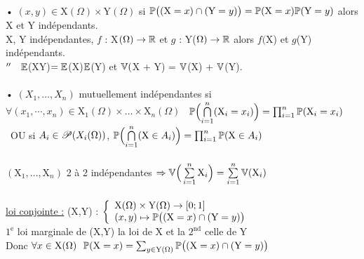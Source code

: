 \documentclass[12 pt]{exampleclass}
\begin{document}
\begin{flushleft}
\begin{doublespace}
	\text{ }\\
	• $(x,y)\in\text{X}(\Omega)\times \text{Y}(\Omega)$ si $\mathbb{P}\big( (\text{X} = x) \cap (\text{Y} = y) \big) = \mathbb{P}(\text{X} =x ) \mathbb{P} (\text{Y} = y)$ alors X et Y indépendants.\\
	X, Y indépendantes, $f$ : X$(\Omega) \rightarrow \mathbb{R}$ et $g$ : Y($\Omega) \rightarrow \mathbb{R}$ alors $f($X) et $g$(Y) indépendants.\\
	\qquad $''  \quad \mathbb{E}$(XY)$ = \mathbb{E}$(X)$\mathbb{E}$(Y) et $\mathbb{V}($X + Y) = $\mathbb{V}$(X) + $\mathbb{V}$(Y).\\
	\text{ }\\
	• $(X_1,\dots, X_n)$ mutuellement indépendantes si $\forall (x_1,\cdots,x_n)\in \text{X}_1(\Omega)\times \dots \times \text{X}_n(\Omega)$ \ $\mathbb{P} \Big( \underset{i = 1}{\overset{n}{\bigcap}} (\text{X}_i = x_i) \Big) = \prod_{ i = 1}^n \mathbb{P} (\text{X}_i = x_i)$ \ OU si $A_i\in \mathscr{P}(X_i(\Omega))$, $\mathbb{P} \Big( \underset{i = 1}{\overset{n}{\bigcap}} (\text{X}\in A_i) \Big) = \prod_{ i = 1}^n \mathbb{P} (\text{X}\in A_i)$\\
	\text{ }\\
	$(\text{X}_1,\dots,\text{X}_n)$ 2 à 2 indépendantes $\Rightarrow\mathbb{V} \Big( \sum\limits_{i = 1}^n \text{X}_i  \Big)= \sum\limits_{i = 1}^n \mathbb{V}(\text{X}_i)$\\
	
	\text{ }\\
	\underline{ loi conjointe :} (X,Y) : $\left\{\begin{array}{ll} \text{X}(\Omega)\times \text{Y}(\Omega) \rightarrow [0; 1] \\ (x,y) \mapsto \mathbb{P} \big( (\text{X} = x) \cap (\text{Y} = y) \big) \end{array} \right.$\\
	$1^{\text{e}}$ loi marginale de (X,Y) la loi de X et la $2^{\text{nd}}$ celle de Y\\
	Donc $\forall x\in \text{X}(\Omega) \ \ \bP(\text{X} = x) = \sum_{y\in \text{Y}(\Omega)} \bP \big( (\text{X} = x) \cap (\text{Y} = y) \big)$\\


\end{doublespace}
\end{flushleft}
\end{document}
